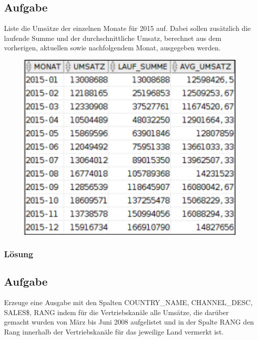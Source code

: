 \subsection{Aufgabe}
Liste die Umsätze der einzelnen Monate für 2015 auf. Dabei sollen zusätzlich die laufende Summe und der durchschnittliche Umsatz, berechnet aus dem vorherigen, aktuellen sowie nachfolgendem Monat, ausgegeben werden.

\begin{figure}[H]
  \centering
  \includegraphics[width=1\textwidth]{img//uebung_07_-_aufgabe_04.png}
  \label{img:uebung_07_-_aufgabe_04}
\end{figure} 

\subsubsection*{Lösung}
\label{subsubsec:uebung_07.aufgabe_04.loesung}


\label{subsec:uebung_07.aufgabe_05}
\subsection{Aufgabe}
Erzeuge eine Ausgabe mit den Spalten COUNTRY\_NAME, CHANNEL\_DESC, SALES\$, RANG indem für die Vertriebskanäle alle Umsätze, die darüber gemacht wurden von März bis Juni 2008 aufgelistet und in der Spalte RANG den Rang innerhalb der Vertriebskanäle für das jeweilige Land vermerkt ist.

